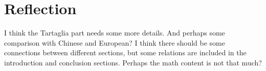 \documentclass{article}
\begin{document}
\newpage




\newpage

\section{Reflection}

I think the Tartaglia part needs some more details. And perhaps some comparison with Chinese and European? I think there should be some connections between different sections, but some relations are included in the introduction and conclusion sections. Perhaps the math content is not that much?
\end{document}
